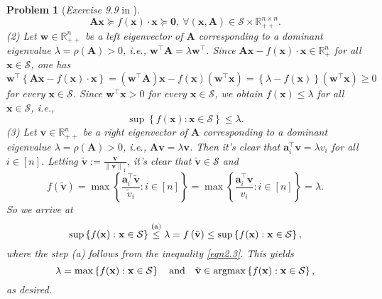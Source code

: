 \documentclass[11pt]{article}
\newtheorem{problem}{Problem}
\DeclareMathOperator*{\argmax}{argmax}
\numberwithin{equation}{problem}
\begin{document}
\begin{problem} [\emph{Exercise 9.9} in \cite{calafiore2014optimization}]
{\begin{equation}
    \mathbf{A x} \succeq f(\mathbf{x}) \cdot \mathbf{x} \succeq \mathbf{0},\ \forall \left( \mathbf{x}, \mathbf{A} \right) \in \mathcal{S} \times \mathbb{R}_{++}^{n \times n}.
\end{equation}
\indent (2) Let $\mathbf{w} \in \mathbb{R}_{++}^{n}$ be a left eigenvector of $\mathbf{A}$ corresponding to a dominant eigenvalue $\lambda = \rho(\mathbf{A}) > 0$, \emph{i.e.}, $\mathbf{w}^{\top} \mathbf{A} = \lambda \mathbf{w}^{\top}$. Since $\mathbf{Ax} - f(\mathbf{x}) \cdot \mathbf{x} \in \mathbb{R}_{+}^n$ for all $\mathbf{x} \in \mathcal{S}$, one has
\begin{equation*}
    \mathbf{w}^{\top} \left\{ \mathbf{Ax} - f(\mathbf{x}) \cdot \mathbf{x} \right\} = \left( \mathbf{w}^{\top} \mathbf{A} \right) \mathbf{x} - f(\mathbf{x}) \left( \mathbf{w}^{\top} \mathbf{x} \right)
    = \left\{ \lambda - f(\mathbf{x}) \right\} \left( \mathbf{w}^{\top} \mathbf{x} \right) \geq 0
\end{equation*}
for every $\mathbf{x} \in \mathcal{S}$. Since $\mathbf{w}^{\top} \mathbf{x} > 0$ for every $\mathbf{x} \in \mathcal{S}$, we obtain $f(\mathbf{x}) \leq \lambda$ for all $\mathbf{x} \in \mathcal{S}$, \emph{i.e.},
\begin{equation}
    \label{eqn2.3}
    \sup \left\{ f(\mathbf{x}) : \mathbf{x} \in \mathcal{S} \right\} \leq \lambda.
\end{equation}
\indent (3) Let $\mathbf{v} \in \mathbb{R}_{++}^{n}$ be a right eigenvector of $\mathbf{A}$ corresponding to a dominant eigenvalue $\lambda = \rho(\mathbf{A}) > 0$, \emph{i.e.}, $\mathbf{Av} = \lambda \mathbf{v}$. Then it's clear that $\mathbf{a}_{i}^{\top} \mathbf{v} = \lambda v_i$ for all $i \in [n]$. Letting $\tilde{\mathbf{v}} := \frac{\mathbf{v}}{\left\| \mathbf{v} \right\|_1}$, it's clear that $\tilde{\mathbf{v}} \in \mathcal{S}$ and
\begin{equation*}
    f \left( \tilde{\mathbf{v}} \right) 
    = \max \left\{ \frac{\mathbf{a}_{i}^{\top} \tilde{\mathbf{v}}}{\tilde{v}_i} : i \in [n] \right\} 
    = \max \left\{ \frac{\mathbf{a}_{i}^{\top} \mathbf{v}}{v_i} : i \in [n] \right\} 
    = \lambda.
\end{equation*}
So we arrive at
\begin{equation*}
    \sup \left\{ f(\mathbf{x}) : \mathbf{x} \in \mathcal{S} \right\} \stackrel{\textnormal{(a)}}{\leq} \lambda = f \left( \tilde{\mathbf{v}} \right)
    \leq \sup \left\{ f(\mathbf{x}) : \mathbf{x} \in \mathcal{S} \right\},
\end{equation*}
where the step (a) follows from the inequality \eqref{eqn2.3}. This yields
\begin{equation*}
    \lambda = \max \left\{ f(\mathbf{x}) : \mathbf{x} \in \mathcal{S} \right\} \quad \textnormal{and} \quad
    \tilde{\mathbf{v}} \in \argmax \left\{ f(\mathbf{x}) : \mathbf{x} \in \mathcal{S} \right\},
\end{equation*}
as desired.
}
\end{problem}

\newpage



\end{document}
